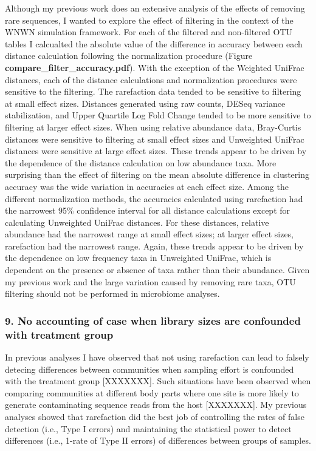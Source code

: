 \documentclass[
]{article}
\begin{document}
Although my previous work does an extensive analysis of the effects of
removing rare sequences, I wanted to explore the effect of filtering in
the context of the WNWN simulation framework. For each of the filtered
and non-filtered OTU tables I calcualted the absolute value of the
difference in accuracy between each distance calculation following the
normalization procedure (Figure \textbf{compare\_filter\_accuracy.pdf}).
With the exception of the Weighted UniFrac distances, each of the
distance calculations and normalization procedures were sensitive to the
filtering. The rarefaction data tended to be sensitive to filtering at
small effect sizes. Distances generated using raw counts, DESeq variance
stabilization, and Upper Quartile Log Fold Change tended to be more
sensitive to filtering at larger effect sizes. When using relative
abundance data, Bray-Curtis distances were sensitive to filtering at
small effect sizes and Unweighted UniFrac distances were sensitive at
large effect sizes. These trends appear to be driven by the dependence
of the distance calculation on low abundance taxa. More surprising than
the effect of filtering on the mean absolute difference in clustering
accuracy was the wide variation in accuracies at each effect size. Among
the different normalization methods, the accuracies calculated using
rarefaction had the narrowest 95\% confidence interval for all distance
calculations except for calculating Unweighted UniFrac distances. For
these distances, relative abundance had the narrowest range at small
effect sizes; at larger effect sizes, rarefaction had the narrowest
range. Again, these trends appear to be driven by the dependence on low
frequency taxa in Unweighted UniFrac, which is dependent on the presence
or absence of taxa rather than their abundance. Given my previous work
and the large variation caused by removing rare taxa, OTU filtering
should not be performed in microbiome analyses.

\hypertarget{no-accounting-of-case-when-library-sizes-are-confounded-with-treatment-group}{%
\subsubsection{9. No accounting of case when library sizes are
confounded with treatment
group}\label{no-accounting-of-case-when-library-sizes-are-confounded-with-treatment-group}}

In previous analyses I have observed that not using rarefaction can lead
to falsely detecing differences between communities when sampling effort
is confounded with the treatment group {[}XXXXXXX{]}. Such situations
have been observed when comparing communities at different body parts
where one site is more likely to generate contaminating sequence reads
from the host {[}XXXXXXX{]}. My previous analyses showed that
rarefaction did the best job of controlling the rates of false detection
(i.e., Type I errors) and maintaining the statistical power to detect
differences (i.e., 1-rate of Type II errors) of differences between
groups of samples.
\end{document}
